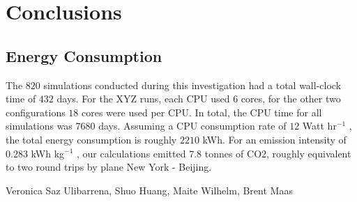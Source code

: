 \documentclass[aa]{lib/aa}
\begin{document}

\section{Conclusions}

\subsection{Energy Consumption}
The $820$ simulations conducted during this investigation had a total wall-clock time of $432$ days. For the XYZ runs, each CPU used $6$ cores, for the other two configurations $18$ cores were used per CPU. In total, the CPU time for all simulations was $7680$ days. Assuming a CPU consumption rate of $12$ Watt hr$^{-1}$ \citep{PortegiesZwart2020}, the total energy consumption is roughly $2210$ kWh. For an emission intensity of $0.283$ kWh kg$^{-1}$ \citep{Wittman}, our calculations emitted $7.8$ tonnes of CO2, roughly equivalent to two round trips by plane New York - Beijing.

\begin{acknowledgements}
Veronica  Saz  Ulibarrena,  Shuo  Huang,  Maite  Wilhelm,  Brent Maas
\end{acknowledgements}

\end{document}
